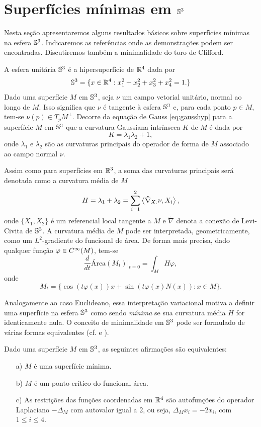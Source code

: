 \section{Superfícies mínimas em $\mathbb{S}^3$}

Nesta seção apresentaremos alguns resultados básicos sobre superfícies mínimas na esfera $\mathbb{S}^3$. Indicaremos as referências onde as demonstrações podem ser encontradas. Discutiremos também a minimalidade do toro de Clifford.

A esfera unitária $\mathbb{S}^3$ é a hipersuperfície de $\mathbb{R}^4$ dada por
\[ \mathbb{S}^3 = \{ x \in \mathbb{R}^4: x_1^2 + x_2^2 + x_3^2 + x_4^2 = 1. \} \]
Dado uma superfície $M$ em $\mathbb{S}^3$, seja $\nu$ um campo vetorial unitário, normal ao longo de $M$. Isso significa que $\nu$ é tangente à esfera $\mathbb{S}^3$ e, para cada ponto $p \in M$, tem-se $\nu(p) \in T_p M^\perp$. Decorre da equação de Gauss \eqref{eq:gausshyp} para a superfície $M$ em $\mathbb{S}^3$ que a curvatura Gaussiana intrínseca $K$ de $M$ é dada por
\[ K = \lambda_1 \lambda_2 + 1, \]
onde $\lambda_1$ e $\lambda_2$ são as curvaturas principais do operador de forma de $M$ associado ao campo normal $\nu$.

Assim como para superfícies em $\mathbb{R}^3$, a soma das curvaturas principais será denotada como a curvatura média de $M$
\[ H = \lambda_1 + \lambda_2 = \sum_{i=1}^{2} \left\langle \tilde{\nabla}_{X_i} \nu,X_i \right\rangle, \]
onde $\{X_1,X_2\}$ é um referencial local tangente a $M$ e $\tilde{\nabla}$ denota a conexão de Levi-Civita de $\mathbb{S}^3$. A curvatura média de $M$ pode ser interpretada, geometricamente, como um $L^2$-gradiente do funcional de área. De forma mais precisa, dado qualquer função $\varphi \in C^\infty(M)$, tem-se
\[ \frac{d}{dt} \text{Área} (M_t) \vert_{t=0} = \int_M H \varphi, \]
onde
\[ M_t = \{ \cos(t \varphi(x))x + \sin(t \varphi(x) N(x)): x \in M \}. \]

Analogamente ao caso Euclideano, essa interpretação variacional motiva a definir uma superfície na esfera $\mathbb{S}^3$ como sendo \emph{mínima} se sua curvatura média $H$ for identicamente nula. O conceito de minimalidade em $\mathbb{S}^3$ pode ser formulado de várias formas equivalentes (cf. \cite[Theorem 3.2.1]{Simons1968} e \cite{Dajczer2019}).

\begin{teorema}\label{propriedades_sup_min_S3}
	Dado uma superfície $M$ em $\mathbb{S}^3$, as seguintes afirmações são equivalentes:
	\begin{enumerate}
		\item[a)] $M$ é uma superfície mínima.
		\item[b)] $M$ é um ponto crítico do funcional área.
		\item[c)] As restrições das funções coordenadas em $\mathbb{R}^4$ são autofunções do operador Laplaciano $-\Delta_M$ com autovalor igual a 2, ou seja, $\Delta_M x_i = -2 x_i$, com $1 \leq i \leq 4$.
	\end{enumerate}
\end{teorema}

